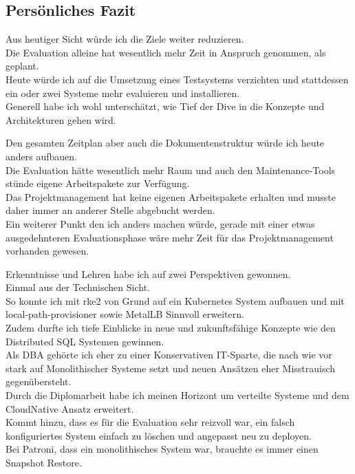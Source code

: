 
\begin{flushleft}
    \section{Persönliches Fazit}
    Aus heutiger Sicht würde ich die Ziele weiter reduzieren.\\
    Die Evaluation alleine hat wesentlich mehr Zeit in Anspruch genommen, als geplant.\\
    Heute würde ich auf die Umsetzung eines Testsystems verzichten und stattdessen ein oder zwei Systeme mehr evaluieren und installieren.\\
    Generell habe ich wohl unterschätzt, wie Tief der Dive in die Konzepte und Architekturen gehen wird.
\end{flushleft}
\begin{flushleft}
    Den gesamten Zeitplan aber auch die Dokumentenstruktur würde ich heute anders aufbauen.\\
    Die Evaluation hätte wesentlich mehr Raum und auch den Maintenance-Tools stünde eigene Arbeitspakete zur Verfügung.\\
    Das Projektmanagement hat keine eigenen Arbeitspakete erhalten und musste daher immer an anderer Stelle abgebucht werden.\\
    Ein weiterer Punkt den ich anders machen würde, gerade mit einer etwas ausgedehnteren Evaluationsphase wäre mehr Zeit für das Projektmanagement vorhanden gewesen.
\end{flushleft}
\begin{flushleft}
    Erkenntnisse und Lehren habe ich auf zwei Perspektiven gewonnen.\\
    Einmal aus der Technischen Sicht.\\
    So konnte ich mit \gls{rke2} von Grund auf ein \Gls{Kubernetes} System aufbauen und mit \gls{local-path-provisioner} sowie \Gls{MetalLB} Sinnvoll erweitern.\\
    Zudem durfte ich tiefe Einblicke in neue und zukunftsfähige Konzepte wie den Distributed SQL Systemen gewinnen.\\
    Als DBA gehörte ich eher zu einer Konservativen IT-Sparte, die nach wie vor stark auf Monolithischer Systeme setzt und neuen Ansätzen eher Misstrauisch gegenübersteht.\\
    Durch die Diplomarbeit habe ich meinen Horizont um verteilte Systeme und dem CloudNative Ansatz erweitert.\\
    Kommt hinzu, dass es für die Evaluation sehr reizvoll war, ein falsch konfiguriertes System einfach zu löschen und angepasst neu zu deployen.\\
    Bei Patroni, dass ein monolithisches System war, brauchte es immer einen Snapshot Restore.
\end{flushleft}
